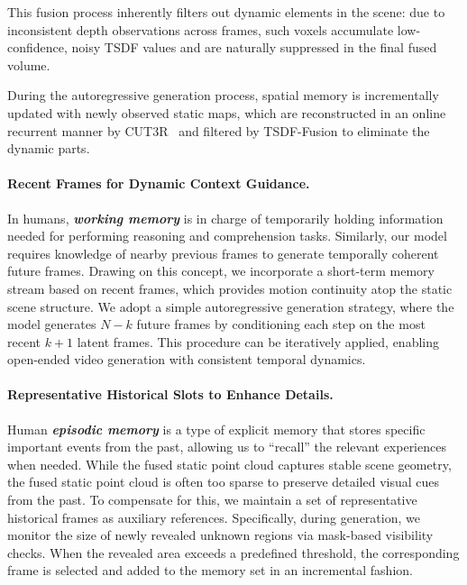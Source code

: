 This fusion process inherently filters out dynamic elements in the scene: due to inconsistent depth observations across frames, such voxels accumulate low-confidence, noisy TSDF values and are naturally suppressed in the final fused volume.

During the autoregressive generation process, spatial memory is incrementally updated with newly observed static maps, which are reconstructed in an online recurrent manner by CUT3R~\cite{wang2025cut3r} and filtered by TSDF-Fusion to eliminate the dynamic parts.

\paragraph{Recent Frames for Dynamic Context Guidance.}
In humans, \textbf{\textit{working memory}} is in charge of temporarily holding information needed for performing reasoning and comprehension tasks. Similarly, our model requires knowledge of nearby previous frames to generate temporally coherent future frames. 
Drawing on this concept, we incorporate a short-term memory stream based on recent frames, which provides motion continuity atop the static scene structure. We adopt a simple autoregressive generation strategy, where the model generates $N - k$ future frames by conditioning each step on the most recent $k + 1$ latent frames. This procedure can be iteratively applied, enabling open-ended video generation with consistent temporal dynamics.

\paragraph{Representative Historical Slots to Enhance Details.}
Human \textbf{\textit{episodic memory}} is a type of explicit memory that stores specific important events from the past, allowing us to ``recall'' the relevant experiences when needed. 
While the fused static point cloud captures stable scene geometry, the fused static point cloud is often too sparse to preserve detailed visual cues from the past. To compensate for this, we maintain a set of representative historical frames as auxiliary references. Specifically, during generation, we monitor the size of newly revealed unknown regions via mask-based visibility checks. When the revealed area exceeds a predefined threshold, the corresponding frame is selected and added to the memory set in an incremental fashion.


